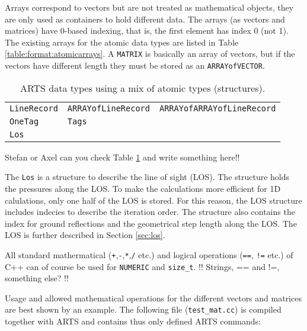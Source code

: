  Arrays correspond to vectors but are not treated as mathematical
 objects, they are only used as containers to hold different data.
 The arrays (as vectors and matrices) have 0-based indexing, that is,
 the first element has index 0 (not 1). The existing arrays for the
 atomic data types are listed in Table \ref{table:format:atomicarrays}.
 A \verb|MATRIX| is basically an array of vectors, but if the vectors
 have different length they must be stored as an \verb|ARRAYofVECTOR|.


 \label{sec:formats:others}

 \begin{table}[t]
  \begin{tabular}{l l l}
   \verb|LineRecord| & \verb|ARRAYofLineRecord| & \verb|ARRAYofARRAYofLineRecord| \\
   \verb|OneTag|     & \verb|Tags|   & \\
   \verb|Los| & & \\
  \end{tabular}
  \caption{ARTS data types using a mix of atomic types (structures).}
  \label{table:format:structures}
 \end{table}
 
 Stefan or Axel can you check Table \ref{table:format:structures} and
 write something here!!
 
 The \verb|Los| is a structure to describe the line of sight (LOS).
 The structure holds the pressures along the LOS. To make the
 calculations more efficient for 1D calulations, only one half of the
 LOS is stored.  For this reason, the LOS structure includes indecies
 to describe the iteration order. The structure also contains the
 index for ground reflections and the geometrical step length along
 the LOS. The LOS is further described in Section \ref{sec:los}.


 \label{sec:formats:maths}
 
 All standard mathermatical (\verb|+|,\verb|-|,\verb|*|,\verb|/| etc.)
 and logical operations (\verb|==|, \verb|!=| etc.) of C++ can of
 course be used for \verb|NUMERIC| and \verb|size_t|. !! Strings, ==
 and !=, something else? !!
 
 
 Usage and allowed mathematical operations for the different vectors
 and matrices are best shown by an example. The following file
 (\verb|test_mat.cc|) is compiled together with ARTS and contains thus
 only defined ARTS commands: {\footnotesize
    }
 
